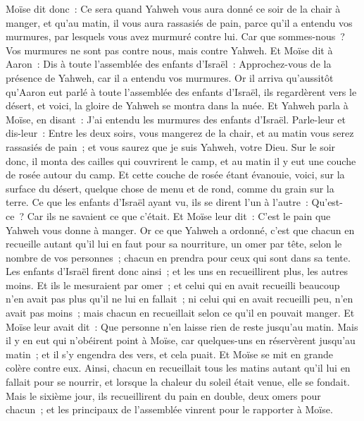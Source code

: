 \begin{multicols}{2}
Moïse dit donc~: Ce sera quand Yahweh vous aura donné ce soir de la chair à manger, et qu'au matin, il vous aura rassasiés de pain, parce qu'il a entendu vos murmures, par lesquels vous avez murmuré contre lui. Car que sommes-nous~? Vos murmures ne sont pas contre nous, mais contre Yahweh.
Et Moïse dit à Aaron~: Dis à toute l'assemblée des enfants d'Israël~: Approchez-vous de la présence de Yahweh, car il a entendu vos murmures.
Or il arriva qu'aussitôt qu'Aaron eut parlé à toute l'assemblée des enfants d'Israël, ils regardèrent vers le désert, et voici, la gloire de Yahweh se montra dans la nuée.
 Et Yahweh parla à Moïse, en disant~:
J'ai entendu les murmures des enfants d'Israël. Parle-leur et dis-leur~: Entre les deux soirs, vous mangerez de la chair, et au matin vous serez rassasiés de pain~; et vous saurez que je suis Yahweh, votre Dieu.
Sur le soir donc, il monta des cailles qui couvrirent le camp, et au matin il y eut une couche de rosée autour du camp.
Et cette couche de rosée étant évanouie, voici, sur la surface du désert, quelque chose de menu et de rond, comme du grain sur la terre.
Ce que les enfants d'Israël ayant vu, ils se dirent l'un à l'autre~: Qu'est-ce~? Car ils ne savaient ce que c'était. Et Moïse leur dit~: C'est le pain que Yahweh vous donne à manger.
Or ce que Yahweh a ordonné, c'est que chacun en recueille autant qu'il lui en faut pour sa nourriture, un omer par tête, selon le nombre de vos personnes~; chacun en prendra pour ceux qui sont dans sa tente.
Les enfants d'Israël firent donc ainsi~; et les uns en recueillirent plus, les autres moins.
Et ils le mesuraient par omer~; et celui qui en avait recueilli beaucoup n'en avait pas plus qu'il ne lui en fallait~; ni celui qui en avait recueilli peu, n'en avait pas moins~; mais chacun en recueillait selon ce qu'il en pouvait manger.
Et Moïse leur avait dit~: Que personne n'en laisse rien de reste jusqu'au matin.
Mais il y en eut qui n'obéirent point à Moïse, car quelques-uns en réservèrent jusqu'au matin~; et il s'y engendra des vers, et cela puait. Et Moïse se mit en grande colère contre eux.
Ainsi, chacun en recueillait tous les matins autant qu'il lui en fallait pour se nourrir, et lorsque la chaleur du soleil était venue, elle se fondait.
Mais le sixième jour, ils recueillirent du pain en double, deux omers pour chacun~; et les principaux de l'assemblée vinrent pour le rapporter à Moïse.

\end{multicols}
